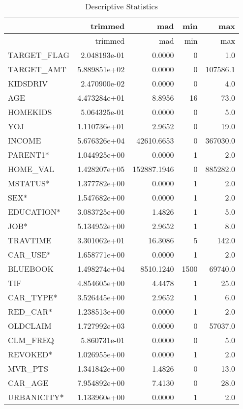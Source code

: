 \documentclass[]{article}
\begin{document}
\begin{longtable}[]{@{}lrrrr@{}}
\caption{Descriptive Statistics}\tabularnewline
\toprule
& trimmed & mad & min & max\tabularnewline
\midrule
\endfirsthead
\toprule
& trimmed & mad & min & max\tabularnewline
\midrule
\endhead
TARGET\_FLAG & 2.048193e-01 & 0.0000 & 0 & 1.0\tabularnewline
TARGET\_AMT & 5.889851e+02 & 0.0000 & 0 & 107586.1\tabularnewline
KIDSDRIV & 2.470900e-02 & 0.0000 & 0 & 4.0\tabularnewline
AGE & 4.473284e+01 & 8.8956 & 16 & 73.0\tabularnewline
HOMEKIDS & 5.064325e-01 & 0.0000 & 0 & 5.0\tabularnewline
YOJ & 1.110736e+01 & 2.9652 & 0 & 19.0\tabularnewline
INCOME & 5.676326e+04 & 42610.6653 & 0 & 367030.0\tabularnewline
PARENT1* & 1.044925e+00 & 0.0000 & 1 & 2.0\tabularnewline
HOME\_VAL & 1.428207e+05 & 152887.1946 & 0 & 885282.0\tabularnewline
MSTATUS* & 1.377782e+00 & 0.0000 & 1 & 2.0\tabularnewline
SEX* & 1.547682e+00 & 0.0000 & 1 & 2.0\tabularnewline
EDUCATION* & 3.083725e+00 & 1.4826 & 1 & 5.0\tabularnewline
JOB* & 5.134952e+00 & 2.9652 & 1 & 8.0\tabularnewline
TRAVTIME & 3.301062e+01 & 16.3086 & 5 & 142.0\tabularnewline
CAR\_USE* & 1.658771e+00 & 0.0000 & 1 & 2.0\tabularnewline
BLUEBOOK & 1.498274e+04 & 8510.1240 & 1500 & 69740.0\tabularnewline
TIF & 4.854605e+00 & 4.4478 & 1 & 25.0\tabularnewline
CAR\_TYPE* & 3.526445e+00 & 2.9652 & 1 & 6.0\tabularnewline
RED\_CAR* & 1.238513e+00 & 0.0000 & 1 & 2.0\tabularnewline
OLDCLAIM & 1.727992e+03 & 0.0000 & 0 & 57037.0\tabularnewline
CLM\_FREQ & 5.860731e-01 & 0.0000 & 0 & 5.0\tabularnewline
REVOKED* & 1.026955e+00 & 0.0000 & 1 & 2.0\tabularnewline
MVR\_PTS & 1.341842e+00 & 1.4826 & 0 & 13.0\tabularnewline
CAR\_AGE & 7.954892e+00 & 7.4130 & 0 & 28.0\tabularnewline
URBANICITY* & 1.133960e+00 & 0.0000 & 1 & 2.0\tabularnewline
\bottomrule
\end{longtable}
\end{document}
